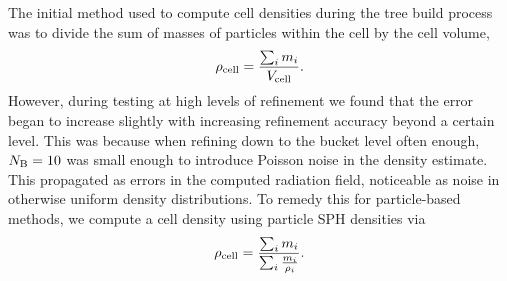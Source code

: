 \documentclass[fleq,usenatbib]{mnras}
\begin{document}
{The initial method used to compute cell densities during the tree build 
process was to divide the sum of masses of particles within the cell by the 
cell volume, 
\begin{equation}
\rho_{\rm cell} = \frac{\sum_i m_i}{V_{\rm cell}}.
\end{equation}
However, during testing at high levels of refinement we found that the error 
began to increase slightly with increasing refinement accuracy beyond a 
certain level. This was because when refining down to the bucket level often 
enough, $N_{\rm B}=10$ was small enough to introduce Poisson noise in the 
density estimate.  This propagated as errors in the computed radiation field, 
noticeable as noise in otherwise uniform density distributions. To remedy this 
for particle-based methods, we compute a cell density using particle SPH 
densities via 
\begin{equation}
\rho_{\rm cell} = \frac{\sum_i m_i}{\sum_i{\frac{m_i}{\rho_i}}}.
\end{equation}

}
\end{document}
